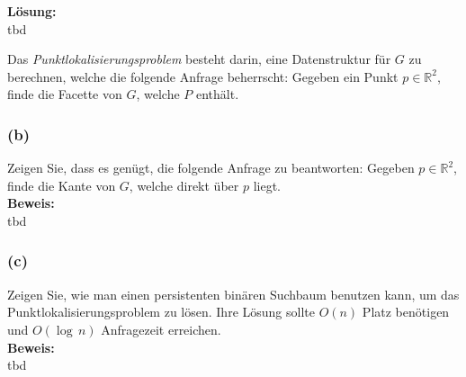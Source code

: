 \documentclass[11pt,a4paper,ngerman]{article}
\begin{document}
\noindent\textbf{Lösung:}\\
tbd

\vspace{4\baselineskip}

Das \emph{Punktlokalisierungsproblem} besteht darin, eine Datenstruktur für $G$ zu berechnen, welche die folgende Anfrage beherrscht: Gegeben ein Punkt $p \in \mathbb{R}^2$, finde die Facette von $G$, welche $P$ enthält.

\subsubsection*{(b)}
Zeigen Sie, dass es genügt, die folgende Anfrage zu beantworten: Gegeben $p\in \mathbb{R}^2$, finde die Kante von $G$, welche direkt über $p$ liegt.\\

\noindent\textbf{Beweis:}\\

tbd

\subsubsection*{(c)}

Zeigen Sie, wie man einen persistenten binären Suchbaum benutzen kann, um das Punktlokalisierungsproblem zu lösen. Ihre Lösung sollte $O(n)$ Platz benötigen und $O(\log \, n)$ Anfragezeit erreichen.\\

\noindent\textbf{Beweis:}\\

tbd

\label{LastPage}
\end{document}
